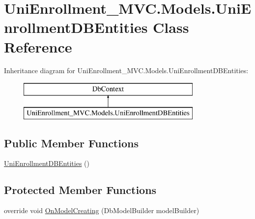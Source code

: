\hypertarget{class_uni_enrollment___m_v_c_1_1_models_1_1_uni_enrollment_d_b_entities}{}\section{Uni\+Enrollment\+\_\+\+M\+V\+C.\+Models.\+Uni\+Enrollment\+D\+B\+Entities Class Reference}
\label{class_uni_enrollment___m_v_c_1_1_models_1_1_uni_enrollment_d_b_entities}
Inheritance diagram for Uni\+Enrollment\+\_\+\+M\+V\+C.\+Models.\+Uni\+Enrollment\+D\+B\+Entities\+:\begin{figure}[H]
\begin{center}
\leavevmode
\includegraphics[height=2.000000cm]{class_uni_enrollment___m_v_c_1_1_models_1_1_uni_enrollment_d_b_entities}
\end{center}
\end{figure}
\subsection*{Public Member Functions}
\begin{DoxyCompactItemize}
\item 
\hyperlink{class_uni_enrollment___m_v_c_1_1_models_1_1_uni_enrollment_d_b_entities_a26c18449ead35261c1995d99249966bc}{Uni\+Enrollment\+D\+B\+Entities} ()
\end{DoxyCompactItemize}
\subsection*{Protected Member Functions}
\begin{DoxyCompactItemize}
\item 
override void \hyperlink{class_uni_enrollment___m_v_c_1_1_models_1_1_uni_enrollment_d_b_entities_a4f979f0b56e6ced6ada444eb2ac67d9e}{On\+Model\+Creating} (Db\+Model\+Builder model\+Builder)
\end{DoxyCompactItemize}
